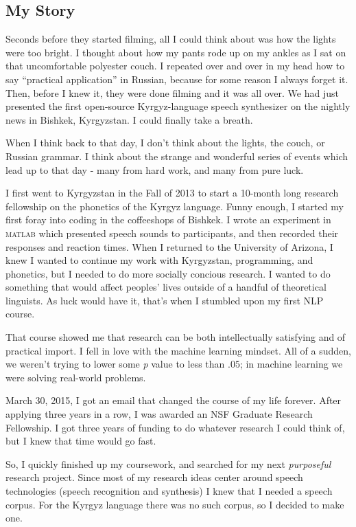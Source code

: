 \documentclass[12pt,a4paper]{article}
\begin{document}
\subsection*{My Story}

Seconds before they started filming, all I could think about was how the lights were too bright. I thought about how my pants rode up on my ankles as I sat on that uncomfortable polyester couch. I repeated over and over in my head how to say ``practical application'' in Russian, because for some reason I always forget it. Then, before I knew it, they were done filming and it was all over. We had just presented the first open-source Kyrgyz-language speech synthesizer on the nightly news in Bishkek, Kyrgyzstan. I could finally take a breath.

When I think back to that day, I don't think about the lights, the couch, or Russian grammar. I think about the strange and wonderful series of events which lead up to that day - many from hard work, and many from pure luck.

I first went to Kyrgyzstan in the Fall of 2013 to start a 10-month long research fellowship on the phonetics of the Kyrgyz language. Funny enough, I started my first foray into coding in the coffeeshops of Bishkek. I wrote an experiment in \textsc{matlab} which presented speech sounds to participants, and then recorded their responses and reaction times. When I returned to the University of Arizona, I knew I wanted to continue my work with Kyrgyzstan, programming, and phonetics, but I needed to do more socially concious research. I wanted to do something that would affect peoples' lives outside of a handful of theoretical linguists. As luck would have it, that's when I stumbled upon my first NLP course.

That course showed me that research can be both intellectually satisfying and of practical import. I fell in love with the machine learning mindset. All of a sudden, we weren't trying to lower some \textit{p} value to less than $.05$; in machine learning we were solving real-world problems.

March 30, 2015, I got an email that changed the course of my life forever. After applying three years in a row, I was awarded an NSF Graduate Research Fellowship. I got three years of funding to do whatever research I could think of, but I knew that time would go fast.

So, I quickly finished up my coursework, and searched for my next \textit{purposeful} research project. Since most of my research ideas center around speech technologies (speech recognition and synthesis) I knew that I needed a speech corpus. For the Kyrgyz language there was no such corpus, so I decided to make one.
\end{document}
